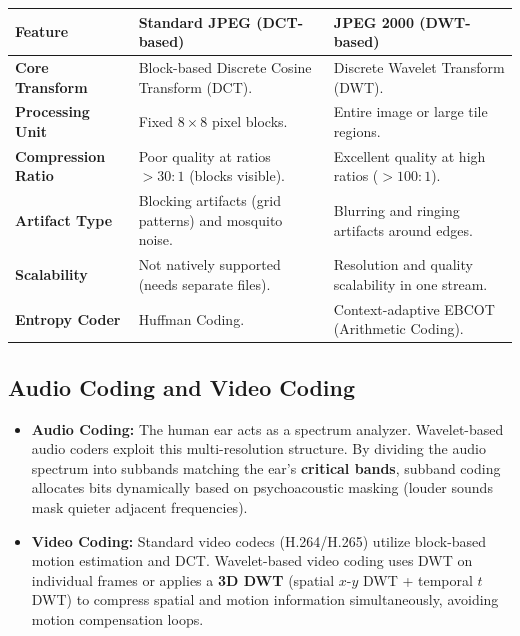 \documentclass[12pt,a4paper]{article}
\renewcommand{\arraystretch}{1.45}
\begin{document}
\par\noindent
{\renewcommand{\arraystretch}{1.4}%
\begin{tabularx}{\linewidth}{|B{3.5cm}|Y|Y|}
\hline
\textbf{Feature} & \textbf{Standard JPEG (DCT-based)} & \textbf{JPEG 2000 (DWT-based)} \\
\hline
\textbf{Core Transform} & Block-based Discrete Cosine Transform (DCT). & Discrete Wavelet Transform (DWT). \\
\hline
\textbf{Processing Unit} & Fixed $8 \times 8$ pixel blocks. & Entire image or large tile regions. \\
\hline
\textbf{Compression Ratio} & Poor quality at ratios $> 30:1$ (blocks visible). & Excellent quality at high ratios ($> 100:1$). \\
\hline
\textbf{Artifact Type} & Blocking artifacts (grid patterns) and mosquito noise. & Blurring and ringing artifacts around edges. \\
\hline
\textbf{Scalability} & Not natively supported (needs separate files). & Resolution and quality scalability in one stream. \\
\hline
\textbf{Entropy Coder} & Huffman Coding. & Context-adaptive EBCOT (Arithmetic Coding). \\
\hline
\end{tabularx}}

\subsection{Audio Coding and Video Coding}
\begin{itemize}[leftmargin=*, itemsep=4pt]
  \item \textbf{Audio Coding:} The human ear acts as a spectrum analyzer. Wavelet-based audio coders exploit this multi-resolution structure. By dividing the audio spectrum into subbands matching the ear's \textbf{critical bands}, subband coding allocates bits dynamically based on psychoacoustic masking (louder sounds mask quieter adjacent frequencies).
  \item \textbf{Video Coding:} Standard video codecs (H.264/H.265) utilize block-based motion estimation and DCT. Wavelet-based video coding uses DWT on individual frames or applies a \textbf{3D DWT} (spatial $x$-$y$ DWT + temporal $t$ DWT) to compress spatial and motion information simultaneously, avoiding motion compensation loops.
\end{itemize}

\end{document}
